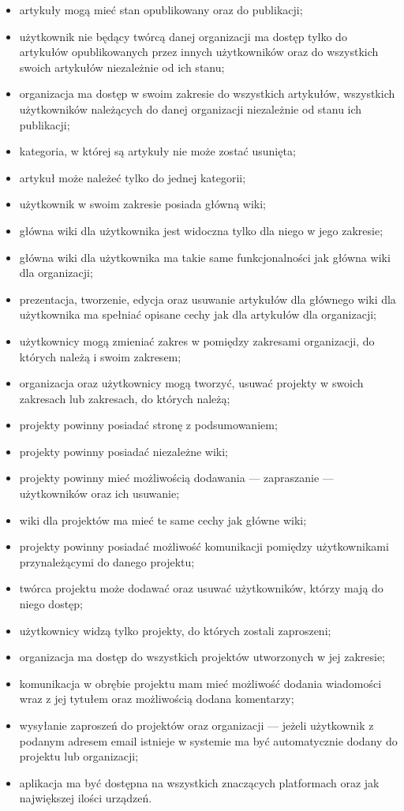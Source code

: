 \begin{itemize}
 \item artykuły mogą mieć stan opublikowany oraz do publikacji;
 \item użytkownik nie będący twórcą danej organizacji ma dostęp tylko do artykułów opublikowanych przez innych użytkowników oraz do wszystkich swoich artykułów niezależnie od ich stanu;
 \item organizacja ma dostęp w swoim zakresie do wszystkich artykułów, wszystkich użytkowników należących do danej organizacji niezależnie od stanu ich publikacji;
 \item kategoria, w której są artykuły nie może zostać usunięta;
 \item artykuł może należeć tylko do jednej kategorii;
 \item użytkownik w swoim zakresie posiada główną wiki;
 \item główna wiki dla użytkownika jest widoczna tylko dla niego w jego zakresie;
 \item główna wiki dla użytkownika ma takie same funkcjonalności jak główna wiki dla organizacji;
 \item prezentacja, tworzenie, edycja oraz usuwanie artykułów dla głównego wiki dla użytkownika ma spełniać opisane cechy jak dla artykułów dla organizacji; 
 \item użytkownicy mogą zmieniać zakres w pomiędzy zakresami organizacji, do których należą i swoim zakresem;
 \item organizacja oraz użytkownicy mogą tworzyć, usuwać projekty w swoich zakresach lub zakresach, do których należą;
 \item projekty powinny posiadać stronę z podsumowaniem;
 \item projekty powinny posiadać niezależne wiki;
 \item projekty powinny mieć możliwością dodawania --- zapraszanie --- użytkowników oraz ich usuwanie;
 \item wiki dla projektów ma mieć te same cechy jak główne wiki;
 \item projekty powinny posiadać możliwość komunikacji pomiędzy użytkownikami przynależącymi do danego projektu;
 \item twórca projektu może dodawać oraz usuwać użytkowników, którzy mają do niego dostęp;
 \item użytkownicy widzą tylko projekty, do których zostali zaproszeni;
 \item organizacja ma dostęp do wszystkich projektów utworzonych w jej zakresie;
 \item komunikacja w obrębie projektu mam mieć możliwość dodania wiadomości wraz z jej tytułem oraz możliwością dodana komentarzy;
 \item wysyłanie zaproszeń do projektów oraz organizacji --- jeżeli użytkownik z podanym adresem email istnieje w systemie ma być automatycznie dodany do projektu lub organizacji;
 \item aplikacja ma być dostępna na wszystkich znaczących platformach oraz jak największej ilości urządzeń.
\end{itemize} 

